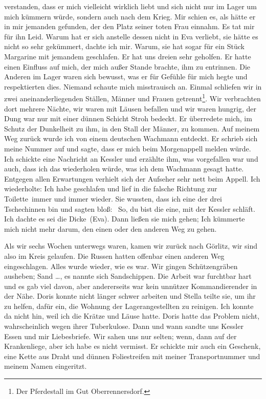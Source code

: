 \documentclass[a4paper,12pt,ngerman,
]{nisebook}
\begin{document}
verstanden, dass er mich vielleicht wirklich liebt und sich nicht nur im Lager um mich kümmern würde, sondern auch nach dem Krieg. Mir schien es, als hätte er in mir jemanden gefunden, der den Platz seiner toten Frau einnahm. Es tat mir für ihn Leid. Warum hat er sich anstelle dessen nicht in Eva verliebt, sie hätte es nicht so sehr gekümmert, dachte ich mir. Warum, sie hat sogar für ein Stück Margarine mit jemandem geschlafen. Er hat uns dreien sehr geholfen. Er hatte einen Einfluss auf mich, der mich außer Stande brachte, ihm zu entrinnen. Die Anderen im Lager waren sich bewusst, was er für Gefühle für mich hegte und respektierten dies. Niemand schaute mich misstrauisch an. Einmal schliefen wir in zwei aneinanderliegenden Ställen, Männer und Frauen getrennt\footnote{Der Pferdestall im Gut Oberrennersdorf.}. Wir verbrachten dort mehrere Nächte, wir waren mit Läusen befallen und wir waren hungrig, der Dung war nur mit einer dünnen Schicht Stroh bedeckt. Er überredete mich, im Schutz der Dunkelheit zu ihm, in den Stall der Männer, zu kommen. Auf meinem Weg zurück wurde ich von einem deutschen Wachmann entdeckt. Er schrieb sich meine Nummer auf und sagte, dass er mich beim Morgenappell melden würde. Ich schickte eine Nachricht an Kessler und erzählte ihm, was vorgefallen war und auch, dass ich das wiederholen würde, was ich dem Wachmann gesagt hatte. Entgegen allen Erwartungen verhielt sich der Aufseher sehr nett beim Appell. Ich wiederholte: \glqq Ich habe geschlafen und lief in die falsche Richtung zur Toilette\grqq~immer und immer wieder. Sie wussten, dass ich eine der drei Tschechinnen bin und sagten bloß: \glqq~So, du bist die eine, mit der Kessler schläft. Ich dachte es sei die Dicke\grqq~(Eva). Dann ließen sie mich gehen; Ich kümmerte mich nicht mehr darum, den einen oder den anderen Weg zu gehen.

Als wir sechs Wochen unterwegs waren, kamen wir zurück nach Görlitz, wir sind also im Kreis gelaufen. Die Russen hatten offenbar einen anderen Weg eingeschlagen. Alles wurde wieder, wie es war. Wir gingen Schützengräben ausheben; Sand \dots, es nannte sich \glqq Sandschippen\grqq. Die Arbeit war furchtbar hart und es gab viel davon, aber andererseits war kein unnützer Komman\-dier\-ender in der Nähe. Doris konnte nicht länger schwer arbeiten und Stella teilte sie, um ihr zu helfen, dafür ein, die Wohnung der Lagerangestellten zu reinigen. Ich konnte da nicht hin, weil ich die Krätze und Läuse hatte. Doris hatte das Problem nicht, wahrscheinlich wegen ihrer Tuberkulose. Dann und wann sandte uns Kessler Essen und mir Liebesbriefe. Wir sahen uns nur selten; wenn, dann auf der Krankenliege, aber ich habe es nicht vermisst. Er schickte mir auch ein Geschenk, eine Kette aus Draht und dünnen Foliestreifen mit meiner Transportnummer und meinem Namen eingeritzt.
\end{document}
